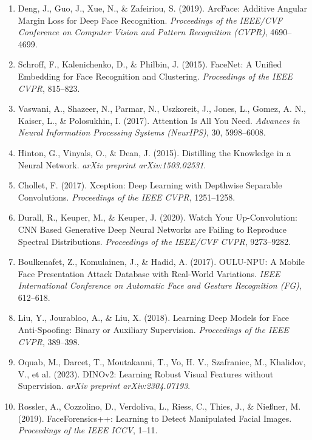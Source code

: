 \begin{enumerate}
    \item Deng, J., Guo, J., Xue, N., \& Zafeiriou, S. (2019). ArcFace: Additive Angular Margin Loss for Deep Face Recognition. \textit{Proceedings of the IEEE/CVF Conference on Computer Vision and Pattern Recognition (CVPR)}, 4690--4699.

    \item Schroff, F., Kalenichenko, D., \& Philbin, J. (2015). FaceNet: A Unified Embedding for Face Recognition and Clustering. \textit{Proceedings of the IEEE CVPR}, 815--823.

    \item Vaswani, A., Shazeer, N., Parmar, N., Uszkoreit, J., Jones, L., Gomez, A. N., Kaiser, L., \& Polosukhin, I. (2017). Attention Is All You Need. \textit{Advances in Neural Information Processing Systems (NeurIPS)}, 30, 5998--6008.

    \item Hinton, G., Vinyals, O., \& Dean, J. (2015). Distilling the Knowledge in a Neural Network. \textit{arXiv preprint arXiv:1503.02531}.

    \item Chollet, F. (2017). Xception: Deep Learning with Depthwise Separable Convolutions. \textit{Proceedings of the IEEE CVPR}, 1251--1258.

    \item Durall, R., Keuper, M., \& Keuper, J. (2020). Watch Your Up-Convolution: CNN Based Generative Deep Neural Networks are Failing to Reproduce Spectral Distributions. \textit{Proceedings of the IEEE/CVF CVPR}, 9273--9282.

    \item Boulkenafet, Z., Komulainen, J., \& Hadid, A. (2017). OULU-NPU: A Mobile Face Presentation Attack Database with Real-World Variations. \textit{IEEE International Conference on Automatic Face and Gesture Recognition (FG)}, 612--618.

    \item Liu, Y., Jourabloo, A., \& Liu, X. (2018). Learning Deep Models for Face Anti-Spoofing: Binary or Auxiliary Supervision. \textit{Proceedings of the IEEE CVPR}, 389--398.

    \item Oquab, M., Darcet, T., Moutakanni, T., Vo, H. V., Szafraniec, M., Khalidov, V., et al. (2023). DINOv2: Learning Robust Visual Features without Supervision. \textit{arXiv preprint arXiv:2304.07193}.

    \item Rossler, A., Cozzolino, D., Verdoliva, L., Riess, C., Thies, J., \& Nießner, M. (2019). FaceForensics++: Learning to Detect Manipulated Facial Images. \textit{Proceedings of the IEEE ICCV}, 1--11.


\end{enumerate}
